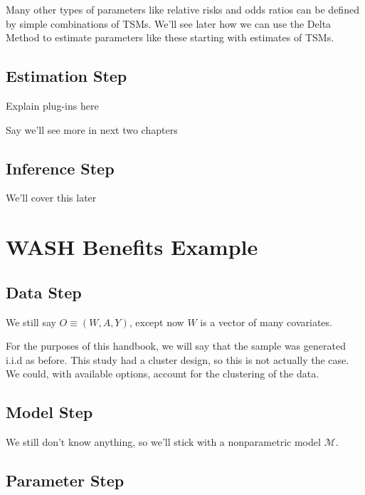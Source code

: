 \documentclass[
  12pt, krantz2,
]{krantz}
\theoremstyle{definition}
\theoremstyle{definition}
\theoremstyle{definition}
\newcommand{\1}{\mathbbm{1}}
\begin{document}
Many other types of parameters like relative risks and odds ratios can be defined by simple combinations of TSMs. We'll see later how we can use the Delta Method to estimate parameters like these starting with estimates of TSMs.

\hypertarget{estimation-step}{%
\subsection{Estimation Step}\label{estimation-step}}

Explain plug-ins here

Say we'll see more in next two chapters

\hypertarget{inference-step}{%
\subsection{Inference Step}\label{inference-step}}

We'll cover this later

\hypertarget{wash-benefits-example}{%
\section{WASH Benefits Example}\label{wash-benefits-example}}

\hypertarget{data-step-1}{%
\subsection{Data Step}\label{data-step-1}}

We still say \(O \equiv (W,A,Y)\), except now \(W\) is a vector of many covariates.

For the purposes of this handbook, we will say that the sample was generated i.i.d as before. This study had a cluster design, so this is not actually the case. We could, with available options, account for the clustering of the data.

\hypertarget{model-step-1}{%
\subsection{Model Step}\label{model-step-1}}

We still don't know anything, so we'll stick with a nonparametric model \(\mathcal{M}\).

\hypertarget{parameter-step-1}{%
\subsection{Parameter Step}\label{parameter-step-1}}
\end{document}
